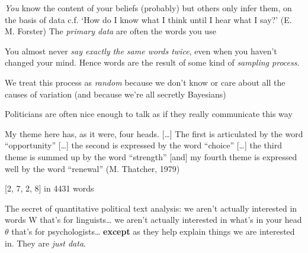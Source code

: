 \documentclass{mediumfoils}
\begin{document}


\textit{You} know the content of your beliefs (probably) 
but others only infer them, on the basis of data
\ita
\itm c.f. `How do I know what I think until I hear what I say?' (E. M. Forster)
\itz
The \textsl{primary data} are often the words you use 

You almost never \textit{say exactly the same words twice}, even when you haven't changed your mind.  Hence words are the result of some kind of \textsl{sampling process}.  
 
We treat this process as \textsl{random} because we don't know or care about all the causes of variation
\ita
\itm (and because we're all secretly Bayesians)
\itz

%
%
%
%


Politicians are often nice enough to talk as if they really communicate this way

\ita
\itm My theme here has, as it were, four heads. [\ldots] The first is articulated by the word ``opportunity'' [\ldots] the second is expressed by the word ``choice'' [\ldots] the third theme is summed up by the word ``strength'' [and] my fourth theme is expressed well by the word ``renewal''
\itm (M. Thatcher, 1979)
\itz

[2, 7, 2, 8] in 4431 words


The secret of quantitative political text analysis:
\ita
\itm we aren't actually interested in words W
\ita
\itm that's for linguists\ldots
\itz
\itm we aren't actually interested in what's in your head $\theta$
\ita
\itm that's for psychologists\ldots
\itz
\itm 
\itm \textbf{except} as they help explain things we are interested in.  They are \textit{just data}.
\itz  


%
%
%
\end{document}
